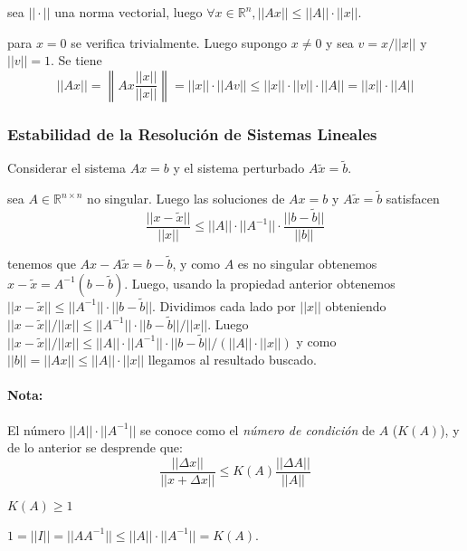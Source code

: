 \Teorema sea \(||\cdot||\) una norma vectorial, luego
\(\forall x \in \ensuremath{\mathbb{R}}^n, || Ax || \leq ||A|| \cdot ||x||\).

\Demostracion para \(x=0\) se verifica trivialmente. Luego supongo
\(x \neq 0\) y sea \(v = x / ||x||\) y \(||v|| = 1\). Se tiene
\[ || Ax || = \left\| A x \frac{||x||}{||x||} \right\|
= ||x|| \cdot ||Av|| \leq ||x|| \cdot ||v|| \cdot ||A|| = ||x|| \cdot ||A||
\]

\hypertarget{estabilidad-de-la-resoluciuxf3n-de-sistemas-lineales}{%
\subsubsection{Estabilidad de la Resolución de Sistemas
Lineales}\label{estabilidad-de-la-resoluciuxf3n-de-sistemas-lineales}}

Considerar el sistema \(Ax = b\) y el sistema perturbado
\(A \tilde{x} = \tilde{b}\).

\Teorema sea \(A \in \ensuremath{\mathbb{R}}^{n \times n}\) no singular.
Luego las soluciones de \(Ax = b\) y \(A \tilde{x} = \tilde{b}\)
satisfacen \[
\frac{||x - \tilde{x}||}{||x||} 
\leq ||A|| \cdot ||A^{-1}|| \cdot \frac{||b - \tilde{b}||}{||b||}
\]

\Demostracion tenemos que \(A x - A \tilde{x} = b - \tilde{b}\), y como
\(A\) es no singular obtenemos
\(x - \tilde{x} = A^{-1} (b - \tilde{b})\). Luego, usando la propiedad
anterior obtenemos
\(||x - \tilde{x}|| \leq ||A^{-1}|| \cdot ||b - \tilde{b}||\). Dividimos
cada lado por \(||x||\) obteniendo
\(||x - \tilde{x}|| / || x|| \leq ||A^{-1}|| \cdot ||b - \tilde{b}||/||x||\).
Luego
\(||x - \tilde{x}||/|| x|| \leq ||A|| \cdot ||A^{-1}|| \cdot ||b - \tilde{b}|| / (||A|| \cdot ||x||)\)
y como \(||b|| = ||Ax|| \leq ||A|| \cdot ||x||\) llegamos al resultado
buscado.

\hypertarget{nota-1}{%
\paragraph{Nota:}\label{nota-1}}

El número \(||A||\cdot||A^{-1}||\) se conoce como el \emph{número de
condición} de \(A\) (\(K(A)\)), y de lo anterior se desprende que: \[
\frac{||\Delta x||}{||x + \Delta x||} \leq K(A) \frac{||\Delta A||}{||A||}
\]

\Lema \(K(A) \geq 1\)

\Demostracion \(1 = ||I|| = ||AA^{-1}|| \leq ||A|| \cdot ||A^{-1}|| = K(A)\).

